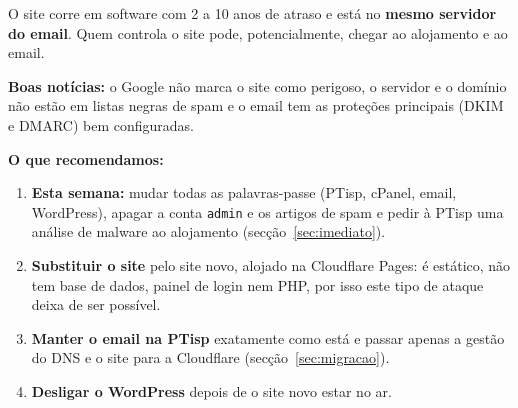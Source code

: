 \documentclass[11pt,a4paper]{article}
\begin{document}
O site corre em software com 2 a 10 anos de atraso e está no \textbf{mesmo servidor do email}. Quem controla
o site pode, potencialmente, chegar ao alojamento e ao email.

\textbf{Boas notícias:} o Google não marca o site como perigoso, o servidor e o domínio não estão em listas
negras de spam e o email tem as proteções principais (DKIM e DMARC) bem configuradas.

\textbf{O que recomendamos:}
\begin{enumerate}
  \item \textbf{Esta semana:} mudar todas as palavras-passe (PTisp, cPanel, email, WordPress), apagar a conta
        \texttt{admin} e os artigos de spam e pedir à PTisp uma análise de malware ao alojamento
        (secção~\ref{sec:imediato}).
  \item \textbf{Substituir o site} pelo site novo, alojado na Cloudflare Pages: é estático, não tem base de
        dados, painel de login nem PHP, por isso este tipo de ataque deixa de ser possível.
  \item \textbf{Manter o email na PTisp} exatamente como está e passar apenas a gestão do DNS e o site para
        a Cloudflare (secção~\ref{sec:migracao}).
  \item \textbf{Desligar o WordPress} depois de o site novo estar no ar.
\end{enumerate}
\end{document}
